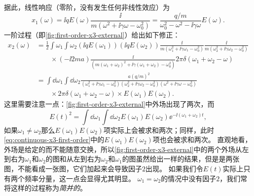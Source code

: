 据此，线性响应（零阶，没有发生任何非线性效应）为
\begin{equation}
    x_1(\omega) = \ii q E(\omega) \frac{\ii}{m (\omega^2 + \ii \gamma \omega - \omega_0^2)} = \frac{q / m}{\omega_0^2 - \omega^2 - \ii \gamma \omega} E(\omega).
\end{equation}
一阶过程（即\autoref{fig:first-order-x3-external}）给出如下修正：
\begin{equation}
    \begin{aligned}
        x_2(\omega) &= \frac{1}{2} \int \omega_1 \int \omega_2 (\ii q E(\omega_1)) (\ii q E(\omega_2)) \frac{\ii}{m(\omega_1^2 + \ii \gamma \omega_1 - \omega_0^2)} \frac{\ii}{m(\omega_2^2 + \ii \gamma \omega_2 - \omega_0^2)} \\ 
        &\quad \quad \times (-\ii 2 m a) \frac{\ii}{(m(\omega_1 + \omega_2)^2 + \ii \gamma (\omega_1 + \omega_2) - \omega_0^2)} 2\pi \delta(\omega_1 + \omega_2 - \omega) \\
        &= \int \dd{\omega_1} \int \dd{\omega_2} \frac{a (q / m)^2}{(\omega_1^2 + \ii \gamma \omega_1 - \omega_0^2) (\omega_2^2 + \ii \gamma \omega_2 - \omega_0^2) (\omega^2 + \ii \gamma \omega - \omega_0^2)}  \\
        &\quad \quad \times 2\pi \delta(\omega_1 + \omega_2 - \omega) \times E(\omega_1) E(\omega_2).
    \end{aligned} 
    \label{eq:continuous-x3-first-order}
\end{equation}
这里需要注意一点：\autoref{fig:first-order-x3-external}中外场出现了两次，而
\[
    E(t)^2 = \int \dd{\omega_1} \int \dd{\omega_2} E(\omega_1) E(\omega_2) \ee^{-\ii (\omega_1 + \omega_2) t},
\]
如果$\omega_1 \neq \omega_2$那么$E(\omega_1) E(\omega_2)$项实际上会被求和两次；同样，此时\eqref{eq:continuous-x3-first-order}中的$E(\omega_1) E(\omega_2)$项也会被求和两次。
直观地看，外场是给定的而不能随意交换，所以\autoref{fig:first-order-x3-external}中的两个外场从左到右为$\omega_1$和$\omega_2$的图和从左到右为$\omega_2$和$\omega_1$的图虽然给出一样的结果，但是是两张图，不能看成一张图，它们加起来会导致因子$2$出现。
如果我们令$E(t)$实际上只有两个频率分量，这一点会显得尤其明显。
$\omega_1 = \omega_2$的情况中没有因子$2$，我们常将这样的过程称为\emph{简并的}。

